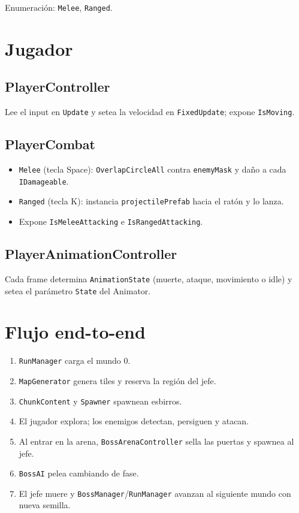 \documentclass[a4paper,12pt]{article}
\begin{document}
Enumeración: \texttt{Melee}, \texttt{Ranged}.

\section{Jugador}

\subsection{PlayerController}

Lee el input en \texttt{Update} y setea la velocidad en \texttt{FixedUpdate}; expone \texttt{IsMoving}.

\subsection{PlayerCombat}

\begin{itemize}
    \item \texttt{Melee} (tecla Space): \texttt{OverlapCircleAll} contra \texttt{enemyMask} y daño a cada \texttt{IDamageable}.
    \item \texttt{Ranged} (tecla K): instancia \texttt{projectilePrefab} hacia el ratón y lo lanza.
    \item Expone \texttt{IsMeleeAttacking} e \texttt{IsRangedAttacking}.
\end{itemize}

\subsection{PlayerAnimationController}

Cada frame determina \texttt{AnimationState} (muerte, ataque, movimiento o idle) y setea el parámetro \texttt{State} del Animator.

\section{Flujo end-to-end}

\begin{enumerate}
    \item \texttt{RunManager} carga el mundo 0.
    \item \texttt{MapGenerator} genera tiles y reserva la región del jefe.
    \item \texttt{ChunkContent} y \texttt{Spawner} spawnean esbirros.
    \item El jugador explora; los enemigos detectan, persiguen y atacan.
    \item Al entrar en la arena, \texttt{BossArenaController} sella las puertas y spawnea al jefe.
    \item \texttt{BossAI} pelea cambiando de fase.
    \item El jefe muere y \texttt{BossManager}/\texttt{RunManager} avanzan al siguiente mundo con nueva semilla.
\end{enumerate}
\end{document}

